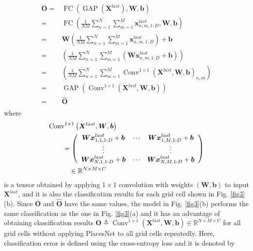\documentclass[journal,comsoc]{IEEEtran}
\begin{document}
\begin{equation}
\begin{aligned}
  \overline {\bm{O}}  = {} & \operatorname{FC} \left( {\operatorname{GAP} \left( {{{\bm{X}}^{last}}} \right),{\bm{W}},{\bm{b}}} \right) \\ 
   = & \operatorname{FC} \left( {\frac{1}{{NM}}\sum\limits_{n = 1}^N {\sum\limits_{m = 1}^M {{\bm{x}}_{n,m,1:D}^{last}} } ,{\bm{W}},{\bm{b}}} \right)\quad  \\ 
   = & {\bm{W}}\left( {\frac{1}{{NM}}\sum\limits_{n = 1}^N {\sum\limits_{m = 1}^M {{\bm{x}}_{n,m,1:D}^{last}} } } \right) + {\bm{b}}\quad  \\ 
   = & \left( {\frac{1}{{NM}}\sum\limits_{n = 1}^N {\sum\limits_{m = 1}^M {\left( {{\bm{Wx}}_{n,m,1:D}^{last} + {\bm{b}}} \right)} } } \right)\quad  \\ 
   = & \left( {\frac{1}{{NM}}\sum\limits_{n = 1}^N {\sum\limits_{m = 1}^M {{{\operatorname{Conv} }^{1 \times 1}}{{\left( {{{\bm{X}}^{last}},{\bm{W}},{\bm{b}}} \right)}_{n,m}}} } } \right) \\ 
   = & \operatorname{GAP} \left( {{{\operatorname{Conv} }^{1 \times 1}}\left( {{{\bm{X}}^{last}},{\bm{W}},{\bm{b}}} \right)} \right) \\ 
   = & \widehat {\bm{O}} \\ 
\label{eq3}
\end{aligned}
\end{equation}
where
\begin{equation}
\begin{aligned}
  {} & {\operatorname{Conv} ^{1 \times 1}}\left( {{{\bm{X}}^{last}},{\bm{W}},{\bm{b}}} \right) \hfill \\
   & \qquad = \left( {\begin{array}{*{20}{c}}
  {{\bm{Wx}}_{1,1,1:D}^{last} + {\bm{b}}}& \cdots &{{\bm{Wx}}_{1,M,1:D}^{last} + {\bm{b}}} \\ 
   \vdots &{}& \vdots  \\ 
  {{\bm{Wx}}_{N,1,1:D}^{last} + {\bm{b}}}& \cdots &{{\bm{Wx}}_{N,M,1:D}^{last} + {\bm{b}}} 
\end{array}} \right) \\
& \qquad \quad \in {\mathbb{R}^{N \times M \times C}} \hfill \\ 
\end{aligned} 
\end{equation}
is a tensor obtained by applying $1 \times 1$ convolution with weights $\left( {{\bm{W}},{\bm{b}}} \right)$ to input ${{\bm{X}}^{last}}$, and it is also the classification results for each grid cell shown in Fig. \ref{fig3}(b). Since $\overline {\bm{O}}$ and $\widehat {\bm{O}}$ have the same values, the model in Fig. \ref{fig3}(b) performs the same classification as the one in Fig. \ref{fig3}(a) and it has an advantage of obtaining classification results ${\bm{O}} \triangleq {\operatorname{Conv} ^{1 \times 1}}\left( {{{\bm{X}}^{last}},{\bm{W}},{\bm{b}}} \right) \in {\mathbb{R}^{N \times M \times C}}$ for all grid cells without applying PlacesNet to all grid cells repeatedly. Here, classification error is defined using the cross-entropy loss and it is denoted by 
\end{document}
